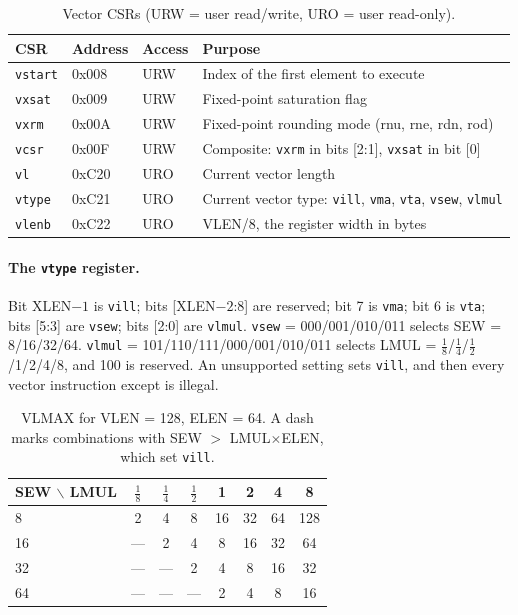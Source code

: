 \documentclass[11pt]{article}
\begin{document}
\begin{table}[htbp]
\centering\small
\caption{Vector CSRs (URW = user read/write, URO = user read-only).}\label{tab:csrs}
\begin{tabularx}{\textwidth}{@{}L{1.7cm}L{1.3cm}L{1.1cm}Y@{}}
\toprule
CSR & Address & Access & Purpose \\
\midrule
\texttt{vstart} & 0x008 & URW & Index of the first element to execute \\
\texttt{vxsat}  & 0x009 & URW & Fixed-point saturation flag \\
\texttt{vxrm}   & 0x00A & URW & Fixed-point rounding mode (rnu, rne, rdn, rod) \\
\texttt{vcsr}   & 0x00F & URW & Composite: \texttt{vxrm} in bits [2:1], \texttt{vxsat} in bit [0] \\
\texttt{vl}     & 0xC20 & URO & Current vector length \\
\texttt{vtype}  & 0xC21 & URO & Current vector type: \texttt{vill}, \texttt{vma}, \texttt{vta}, \texttt{vsew}, \texttt{vlmul} \\
\texttt{vlenb}  & 0xC22 & URO & VLEN/8, the register width in bytes \\
\bottomrule
\end{tabularx}
\end{table}

\paragraph{The \texttt{vtype} register.} Bit XLEN$-1$ is \texttt{vill}; bits [XLEN$-2$:8] are reserved;
bit 7 is \texttt{vma}; bit 6 is \texttt{vta}; bits [5:3] are \texttt{vsew}; bits [2:0] are
\texttt{vlmul}. \texttt{vsew} = 000/001/010/011 selects SEW = 8/16/32/64.
\texttt{vlmul} = 101/110/111/000/001/010/011 selects LMUL = $\tfrac18$/$\tfrac14$/$\tfrac12$/1/2/4/8, and 100 is reserved.
An unsupported setting sets \texttt{vill}, and then every vector instruction except
 is illegal.

\begin{table}[htbp]
\centering\small
\caption{VLMAX for VLEN = 128, ELEN = 64. A dash marks combinations with SEW $>$ LMUL$\times$ELEN, which set \texttt{vill}.}\label{tab:vlmax}
\begin{tabular}{@{}lccccccc@{}}
\toprule
SEW $\backslash$ LMUL & $\tfrac18$ & $\tfrac14$ & $\tfrac12$ & 1 & 2 & 4 & 8 \\
\midrule
8  & 2 & 4 & 8 & 16 & 32 & 64 & 128 \\
16 & --- & 2 & 4 & 8 & 16 & 32 & 64 \\
32 & --- & --- & 2 & 4 & 8 & 16 & 32 \\
64 & --- & --- & --- & 2 & 4 & 8 & 16 \\
\bottomrule
\end{tabular}
\end{table}
\end{document}
